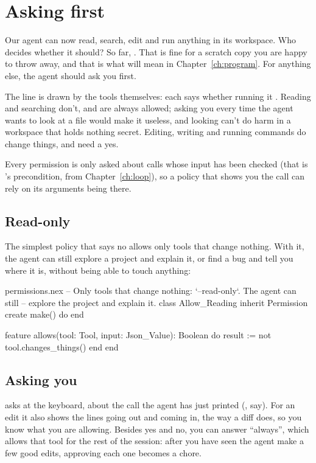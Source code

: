 \chapter{Asking first}\label{ch:permission}

Our agent can now read, search, edit and run anything in its workspace.
Who decides whether it should? So far, . That is
fine for a scratch copy you are happy to throw away, and that is what
 will mean in Chapter~\ref{ch:program}. For anything else, the
agent should ask you first.

The line is drawn by the tools themselves: each says whether running it
. Reading and searching don't, and are always allowed;
asking you every time the agent wants to look at a file would make it
useless, and looking can't do harm in a workspace that holds nothing
secret. Editing, writing and running commands do change things, and need
a yes.

Every permission is only asked about calls whose input has been checked
(that is 's precondition, from Chapter~\ref{ch:loop}), so
a policy that shows you the call can rely on its arguments being there.

\section{Read-only}

The simplest policy that says no allows only tools that change nothing.
With it, the agent can still explore a project and explain it, or find a
bug and tell you where it is, without being able to touch anything:

\begin{append}{permissions.nex}
-- Only tools that change nothing: `--read-only`. The agent can still
-- explore the project and explain it.
class Allow_Reading inherit Permission
create
  make() do
  end

feature
  allows(tool: Tool, input: Json_Value): Boolean do
    result := not tool.changes_things()
  end
end
\end{append}

\section{Asking you}

 asks at the keyboard, about the call the agent has just
printed (, say). For an edit it also shows
the lines going out and coming in, the way a diff does, so you know what
you are allowing.
Besides yes and no, you can answer ``always'', which allows that tool for
the rest of the session: after you have seen the agent make a few good
edits, approving each one becomes a chore.

